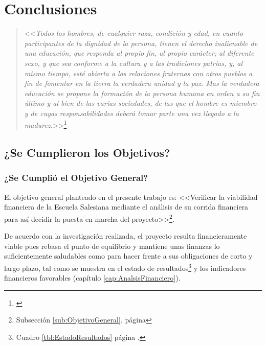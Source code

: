 \chapter*{Conclusiones}

\begin{quote}
<<\textit{Todos los hombres, de cualquier raza, condición y edad, en cuanto participantes de la dignidad de la persona, tienen el derecho inalienable de una educación, que responda al propio fin, al propio carácter; al diferente sexo, y que sea conforme a la cultura y a las tradiciones patrias, y, al mismo tiempo, esté abierta a las relaciones fraternas con otros pueblos a fin de fomentar en la tierra la verdadera unidad y la paz. Mas la verdadera educación se propone la formación de la persona humana en orden a su fin último y al bien de las varias sociedades, de las que el hombre es miembro y de cuyas responsabilidades deberá tomar parte una vez llegado a la madurez.}>>\footnote{\citep{GRED1965}}
\end{quote}

\section*{¿Se Cumplieron los Objetivos?}

\subsection*{¿Se Cumplió el Objetivo General?}


El objetivo general planteado en el presente trabajo es: <<Verificar la viabilidad financiera de la Escuela Salesiana mediante el análisis de su corrida financiera para así decidir la puesta en marcha del proyecto>>\footnote{Subsección \ref{sub:ObjetivoGeneral}, página \pageref{sub:ObjetivoGeneral}}.

De acuerdo con la investigación realizada, el proyecto resulta financieramente viable pues rebasa el punto de equilibrio y mantiene unas finanzas lo suficientemente saludables como para hacer frente a sus obligaciones de corto y largo plazo, tal como se muestra en el estado de resultados\footnote{Cuadro \ref{tbl:EstadoResultados} página \pageref{tbl:EstadoResultados}.} y los indicadores financieros favorables (capítulo \ref{cap:AnalsisFinanciero}).

